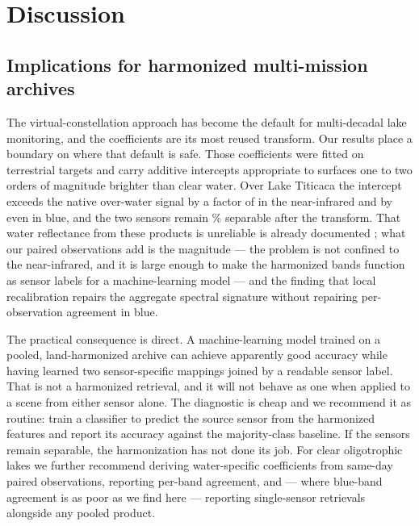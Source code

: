 \documentclass[preprint,review,12pt,authoryear]{elsarticle}
\begin{document}
\section{Discussion}\label{sec:discussion}

\subsection{Implications for harmonized multi-mission archives}

The virtual-constellation approach \citep{Claverie2018,Pahlevan2019} has
become the default for multi-decadal lake monitoring, and the
\citet{Roy2016} coefficients are its most reused transform. Our results place
a boundary on where that default is safe. Those coefficients were fitted on
terrestrial targets and carry additive intercepts appropriate to surfaces one
to two orders of magnitude brighter than clear water. Over Lake Titicaca the
intercept exceeds the native over-water signal by a factor of
\numRoyRatioNir{} in the near-infrared and by \numRoyRatioBlue{} even in
blue, and the two sensors remain \numSensorAccAll\% separable after the
transform. That water reflectance from these products is unreliable is
already documented \citep{Pahlevan2019,HLSguide}; what our paired
observations add is the magnitude --- the problem is not confined to the
near-infrared, and it is large enough to make the harmonized bands function
as sensor labels for a machine-learning model --- and the finding that local
recalibration repairs the aggregate spectral signature without repairing
per-observation agreement in blue.

The practical consequence is direct. A machine-learning model trained on a
pooled, land-harmonized archive can achieve apparently good accuracy while
having learned two sensor-specific mappings joined by a readable sensor
label. That is not a harmonized retrieval, and it will not behave as one when
applied to a scene from either sensor alone. The diagnostic is cheap and we
recommend it as routine: train a classifier to predict the source sensor from
the harmonized features and report its accuracy against the majority-class
baseline. If the sensors remain separable, the harmonization has not done its
job. For clear oligotrophic lakes we further recommend deriving
water-specific coefficients from same-day paired observations, reporting
per-band agreement, and --- where blue-band agreement is as poor as we find
here --- reporting single-sensor retrievals alongside any pooled product.
\end{document}
